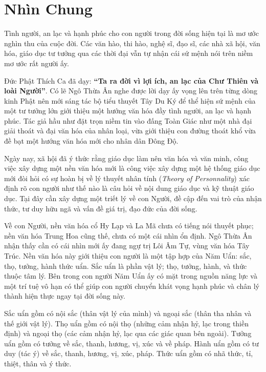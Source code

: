 \chapter{Nhìn Chung} %
\label{cha:nhin_chung}

Tình người, an lạc và hạnh phúc cho con người trong đời sống hiện tại là mơ ước nghìn thu của cuộc đời. Các văn hào, thi hào, nghệ sĩ, đạo sĩ, các nhà xã hội, văn hóa, giáo dục tư tưởng qua các thời đại vẫn tự nhận cái sứ mệnh nói trên niềm mơ ước rất người ấy.

Đức Phật Thích Ca đã dạy: {\bf ``Ta ra đời vì lợi ích, an lạc của Chư Thiên và loài Người''}. Có lẽ Ngô Thừa Ân nghe được lời dạy ấy vọng lên trên từng dòng kinh Phật nên mới sáng tác bộ tiểu thuyết Tây Du Ký để thể hiện sứ mệnh của một tư tưởng lớn giới thiệu một hướng văn hóa đầy tình người, an lạc và hạnh phúc. Tác giả hầu như đặt trọn niềm tin vào đấng Toàn Giác như một nhà đại giải thoát và đại văn hóa của nhân loại, vừa giới thiệu con đường thoát khổ vừa đề bạt một hướng văn hóa mới cho nhân dân Đông Độ.

Ngày nay, xã hội đã ý thức rằng giáo dục làm nên văn hóa và văn minh, công việc xây dựng một nền văn hóa mới là công việc xây dựng một hệ thống giáo dục mới đòi hỏi có sự hoàn bị về lý thuyết nhân tính (\emph{Theory of Personnality}) xác định rõ con người như thế nào là câu hỏi về nội dung giáo dục và kỹ thuật giáo dục. Tại đây cần xây dựng một triết lý về con Người, đề cập đến vai trò của nhận thức, tư duy hữu ngã và vấn đề giá trị, đạo đức của đời sống.

Về con Người, nền văn hóa cổ Hy Lạp và La Mã chưa có tiếng nói thuyết phục; nền văn hóa Trung Hoa cũng thế, chưa có một cái nhìn ổn định. Ngô Thừa Ân nhận thấy cần có cái nhìn mới ấy đang ngự trị Lôi Âm Tự, vùng văn hóa Tây Trúc. Nền văn hóa này giới thiệu con người là một tập hợp của Năm Uẩn: sắc, thọ, tưởng, hành thức uẩn. Sắc uẩn là phần vật lý; thọ, tưởng, hành, và thức thuộc tâm lý. Bên trong con người Năm Uẩn ấy có mặt trong nguồn năng lực và một trí tuệ vô hạn có thể giúp con người chuyển khát vọng hạnh phúc và chân lý thành hiện thực ngay tại đời sống này.

Sắc uẩn gồm có nội sắc (thân vật lý của mình) và ngoại sắc (thân tha nhân và thế giới vật lý). Thọ uẩn gồm có nội thọ (những cảm nhận hỷ, lạc trong thiền định) và ngoại thọ (các cảm nhận hỷ, lạc qua các giác quan bên ngoài). Tưởng uẩn gồm có tưởng về sắc, thanh, hương, vị, xúc và về pháp. Hành uẩn gồm có tư duy (tác ý) về sắc, thanh, hương, vị, xúc, pháp. Thức uẩn gồm có nhã thức, tỉ, thiệt, thân và ý thức.

